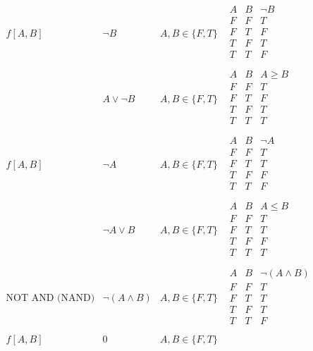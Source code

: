 \documentclass[11pt]{article}
\begin{document}
\newpage
\[
\begin{array}{|c|c|c|c|}
\hline
f[A, B] & \neg B & A, B \in \{F, T\} & \begin{array}{|c|c|c|}
A & B & \neg B \\
\hline
F & F & T \\
F & T & F \\
T & F & T \\
T & T & F \\
\end{array} \\
\hline
\text{} & A \lor \lnot B & A, B \in \{F, T\} & \begin{array}{|c|c|c|}
A & B & A \geq B \\
\hline
F & F & T \\
F & T & F \\
T & F & T \\
T & T & T \\
\end{array} \\
\hline
f[A, B] & \neg A & A, B \in \{F, T\} & \begin{array}{|c|c|c|}
A & B & \neg A \\
\hline
F & F & T \\
F & T & T \\
T & F & F \\
T & T & F \\
\end{array} \\
\hline
\text{} & \lnot A \lor B & A, B \in \{F, T\} & \begin{array}{|c|c|c|}
A & B & A \leq B \\
\hline
F & F & T \\
F & T & T \\
T & F & F \\
T & T & T \\
\end{array} \\
\hline
\text{NOT AND (NAND)} & \neg (A \land B) & A, B \in \{F, T\} & \begin{array}{|c|c|c|}
A & B & \neg (A \land B) \\
\hline
F & F & T \\
F & T & T \\
T & F & T \\
T & T & F \\
\end{array} \\
\hline
f[A, B] & 0 & A, B \in \{F, T\} & \begin{array}{|c|c|c|}

\end{array}
\end{array}\]
\end{document}
